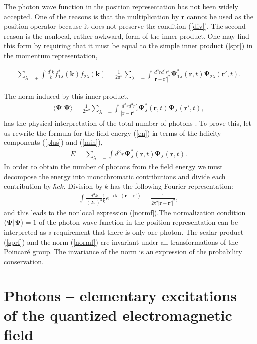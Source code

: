 \documentclass[twocolumn,aps,pra,10pt]{revtex4-1}
\begin{document}
The photon wave function in the position representation has not been widely accepted. One of the reasons is that the multiplication by $\bm r$ cannot be used as the position operator because it does not preserve the condition (\ref{div}). The second reason is the nonlocal, rather awkward, form of the inner product. One may find this form by requiring that it must be equal to the simple inner product (\ref{spr}) in the momentum representation,
\begin{widetext}
\begin{align}\label{sprf}
\sum_{\lambda=\pm}\int\!\frac{d^3k}{k}f_{1\lambda}^*({\bm k})f_{2\lambda}({\bm k})=\frac{1}{2\pi^2}\sum_{\lambda=\pm}\int\!\frac{d^3rd^3r'}{|\bm r-\bm r'|^2}{\bm \Psi}^*_{1\lambda}(\bm r,t){\bm \Psi}_{2\lambda}(\bm r',t).
\end{align}
\end{widetext}
The norm induced by this inner product,
\begin{align}\label{normf}
\langle{\bm \Psi}|{\bm \Psi}\rangle=\frac{1}{2\pi^2}\sum_{\lambda
=\pm}\int\!\frac{d^3rd^3r'}{|\bm r-\bm r'|^2}{\bm \Psi}^*_{\lambda}(\bm r,t){\bm \Psi}_{\lambda}(\bm r',t),
\end{align}
has the physical interpretation of the total number of photons \cite{zeld}. To prove this, let us rewrite the formula for the field energy (\ref{en}) in terms of the helicity components (\ref{plus}) and (\ref{min}),
\begin{align}\label{enpsi}
E=\sum_{\lambda=\pm}\int\!d^3r{\bm \Psi}^*_{\lambda}(\bm r,t){\bm \Psi}_{\lambda}(\bm r,t).
\end{align}
In order to obtain the number of photons from the field energy we must decompose the energy into monochromatic contributions and divide each contribution by $\hbar ck$. Division by $k$ has the following Fourier representation:
\begin{align}
\int \frac{d^3k}{(2\pi)^3}\frac{1}{k}e^{-i{\bm k}\cdot({\bm r}-{\bm r'})} = \frac{1}{2\pi^2|\bm r-\bm r'|^2},
\end{align}
and this leads to the nonlocal expression (\ref{normf}).The normalization condition $\langle{\bm \Psi}|{\bm \Psi}\rangle=1$ of the photon wave function in the position representation can be interpreted as a requirement that there is only one photon. The scalar product (\ref{sprf}) and the norm (\ref{normf}) are invariant under all transformations of the Poincar\'e group. The invariance of the norm is an expression of the probability conservation.

\section{Photons -- elementary excitations of the quantized electromagnetic field}
\end{document}

